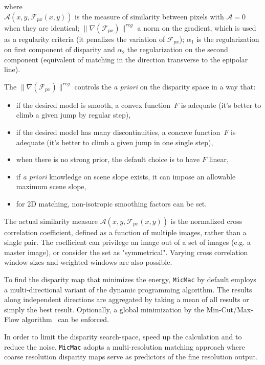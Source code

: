 \documentclass[twocolumn]{bmcart}%
\newcommand{\Ress}{\ensuremath{{\mathcal A}}}
\newcommand{\FPx}{\ensuremath{{\mathcal F}_{px}}}
\begin{document}
where\\
$\Ress(x,y,\FPx(x,y))$ is the measure of similarity between pixels with $\Ress=0$ when they are identical; $\| \nabla(\FPx) \|^{reg}$ a norm on the gradient, which is used as
 a regularity criteria (it penalizes the variation of \FPx); $\alpha_1$ is the regularization on first component of disparity and $\alpha_2$ the regularization  on the second component (equivalent of matching in the direction transverse to the epipolar line).\par 
%
\vspace{0.5cm}
The $\| \nabla(\FPx) \|^{reg}$ controls the \textit{a priori} on the disparity space in a way that:

\begin{itemize}
   \item  if the desired model is smooth, a convex  function~$F$  is adequate (it's better to
          climb a given jump by regular step),

   \item  if  the desired model has many discontinuities, a concave function~$F$ is adequate
          (it's better to climb a given jump in one single step),

   \item when there is no strong prior, the  default choice is to have $F$ linear,

   \item if \textit{a priori} knowledge on scene slope exists, it can impose an allowable maximum scene slope,
   \item for 2D matching, non-isotropic smoothing factors can be set. 
\end{itemize}
%
The actual similarity measure $\Ress(x,y,\FPx(x,y))$ is the normalized cross correlation coefficient, defined as a function of multiple images, rather than a single pair. The coefficient can privilege an image out of a set of images (e.g. a master image), or consider the set as "symmetrical". Varying cross correlation window sizes and weighted windows are also possible.\par 
%
To find the disparity map that minimizes the energy, {\tt MicMac} by default employs a multi-directional variant of the dynamic programming algorithm. The results along independent directions are aggregated by taking a mean of all results or simply the best result. Optionally, a global minimization by the Min-Cut/Max-Flow algorithm~\cite{roy1998maximum} can be enforced.\par 
%
In order to limit the disparity search-space, speed up the calculation and to reduce the noise,  {\tt MicMac} adopts a multi-resolution matching approach where coarse resolution disparity maps serve as predictors of the fine resolution output.\par 
% 
\end{document}
